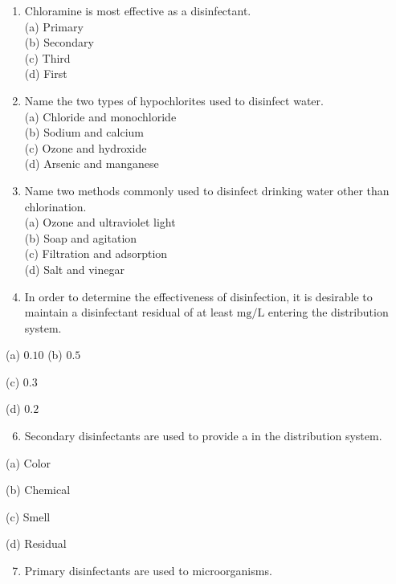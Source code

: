 \documentclass[10pt]{article}
\begin{document}
\begin{enumerate}
\begin{enumerate}
\begin{enumerate}
  \item Chloramine is most effective as a disinfectant.\\
(a) Primary\\
(b) Secondary\\
(c) Third\\
(d) First\\

  \item Name the two types of hypochlorites used to disinfect water.\\
(a) Chloride and monochloride\\
(b) Sodium and calcium\\
(c) Ozone and hydroxide\\
(d) Arsenic and manganese\\

  \item Name two methods commonly used to disinfect drinking water other than chlorination.\\
(a) Ozone and ultraviolet light\\
(b) Soap and agitation\\
(c) Filtration and adsorption\\
(d) Salt and vinegar\\

  \item In order to determine the effectiveness of disinfection, it is desirable to maintain a disinfectant residual of at least $\mathrm{mg} / \mathrm{L}$ entering the distribution system.

\end{enumerate}

(a) $0.10$ (b) $0.5$

(c) $0.3$

(d) $0.2$

\begin{enumerate}
  \setcounter{enumi}{5}
  \item Secondary disinfectants are used to provide a in the distribution system.
\end{enumerate}

(a) Color

(b) Chemical

(c) Smell

(d) Residual

\begin{enumerate}
  \setcounter{enumi}{6}
  \item Primary disinfectants are used to microorganisms.
\end{enumerate}


\end{enumerate}
\end{enumerate}
\end{document}
